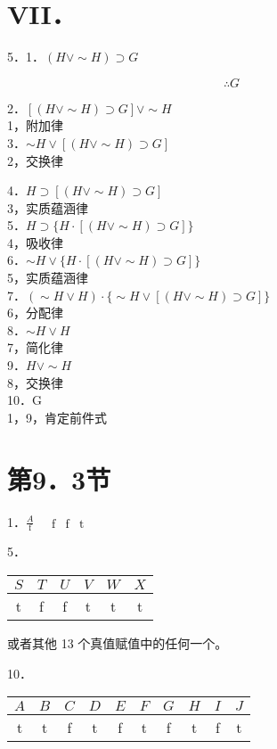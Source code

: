 \section*{VII．}
5．1．$(H \vee \sim H) \supset G$

$$
\therefore G
$$

2．$[(H \vee \sim H) \supset G] \vee \sim H$\\
1，附加律\\
3．$\sim H \vee[(H \vee \sim H) \supset G]$\\
2，交换律

4．$H \supset[(H \vee \sim H) \supset G]$\\
3，实质蕴涵律\\
5．$H \supset\{H \cdot[(H \vee \sim H) \supset G]\}$\\
4，吸收律\\
6．$\sim H \vee\{H \cdot[(H \vee \sim H) \supset G]\}$\\
5，实质蕴涵律\\
7．$(\sim H \vee H) \cdot\{\sim H \vee[(H \vee \sim H) \supset G]\}$\\
6，分配律\\
8．$\sim H \vee H$\\
7，简化律\\
9．$H \vee \sim H$\\
8，交换律\\
10．G\\
1，9，肯定前件式

\section*{第9．3节}
1．$\frac{A}{\mathrm{f}} \quad \begin{array}{cccc}\mathrm{f} & \mathrm{f} & \mathrm{t}\end{array}$

5． \begin{tabular}{cccccc}
$S$ & $T$ & $U$ & $V$ & $W$ & $X$ \\
\hline
t & f & f & t & t & t \\
\hline
\end{tabular}

或者其他 13 个真值赋值中的任何一个。

10． \begin{tabular}{cccccccccc}
$A$ & $B$ & $C$ & $D$ & $E$ & $F$ & $G$ & $H$ & $I$ & $J$ \\
\hline
t & t & f & t & f & t & f & t & f & t \\
\hline
\end{tabular}

